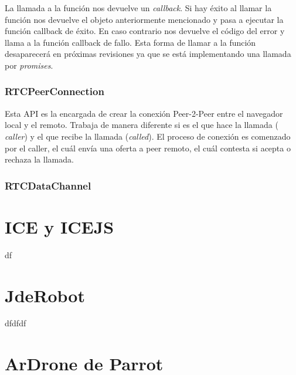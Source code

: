 La llamada a la función nos devuelve un \textit{callback}. Si hay éxito al llamar la función nos devuelve el objeto anteriormente mencionado y pasa a ejecutar la función callback de éxito. En caso contrario nos devuelve el código del error y llama a la función callback de fallo. Esta forma de llamar a la función desaparecerá en próximas revisiones ya que se está implementando una llamada por \textit{promises}.\\


\subsubsection{RTCPeerConnection}

Esta API es la encargada de crear la conexión Peer-2-Peer entre el navegador local y el remoto. Trabaja de manera diferente si es el que hace la llamada ( \textit{caller}) y el que recibe la llamada (\textit{called}). El proceso de conexión es comenzado por el caller, el cuál envía una oferta a peer remoto, el cuál contesta si acepta o rechaza la llamada.

\subsubsection{RTCDataChannel}


\section{ICE y ICEJS}

df

\section{JdeRobot}

dfdfdf

\section{ArDrone de Parrot}

